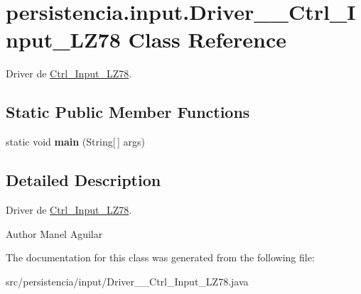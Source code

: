 \hypertarget{classpersistencia_1_1input_1_1Driver____Ctrl__Input__LZ78}{}\section{persistencia.\+input.\+Driver\+\_\+\+\_\+\+Ctrl\+\_\+\+Input\+\_\+\+L\+Z78 Class Reference}
\label{classpersistencia_1_1input_1_1Driver____Ctrl__Input__LZ78}


Driver de \hyperlink{classpersistencia_1_1input_1_1Ctrl__Input__LZ78}{Ctrl\+\_\+\+Input\+\_\+\+L\+Z78}.  


\subsection*{Static Public Member Functions}
\begin{DoxyCompactItemize}
\item 
\mbox{\label{classpersistencia_1_1input_1_1Driver____Ctrl__Input__LZ78_adb756847df72081fa229549543e03569}} 
static void {\bfseries main} (String\mbox{[}$\,$\mbox{]} args)
\end{DoxyCompactItemize}


\subsection{Detailed Description}
Driver de \hyperlink{classpersistencia_1_1input_1_1Ctrl__Input__LZ78}{Ctrl\+\_\+\+Input\+\_\+\+L\+Z78}. 

\begin{DoxyAuthor}{Author}
Manel Aguilar 
\end{DoxyAuthor}


The documentation for this class was generated from the following file\+:\begin{DoxyCompactItemize}
\item 
src/persistencia/input/Driver\+\_\+\+\_\+\+Ctrl\+\_\+\+Input\+\_\+\+L\+Z78.\+java\end{DoxyCompactItemize}
